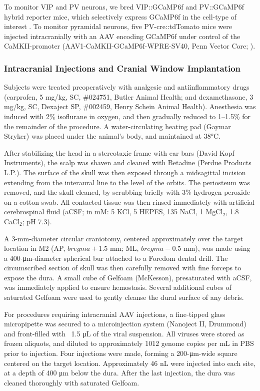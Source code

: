 {To monitor VIP and PV neurons, we bred VIP::GCaMP6f and PV::GCaMP6f hybrid reporter mice, which selectively express GCaMP6f in the cell-type of interest \citep{daigle18,devries20}. 
To monitor pyramidal neurons, five PV-cre::tdTomato mice were injected intracranially with an AAV encoding GCaMP6f under control of the CaMKII-promoter (AAV1-CaMKII-GCaMP6f-WPRE-SV40, Penn Vector Core; \cite{kuchibhotla17,ali20}). 

\subsubsection*{Intracranial Injections and Cranial Window Implantation}
Subjects were treated preoperatively with analgesic and antiinflammatory drugs (carprofen, 5 mg/kg, SC, \#024751, Butler Animal Health; and dexamethasone, 3 mg/kg, SC, Dexaject SP, \#002459, Henry Schein Animal Health). Anesthesia was induced with 2\% isoflurane in oxygen, and then gradually reduced to 1--1.5\% for the remainder of the procedure. A water-circulating heating pad (Gaymar Stryker) was placed under the animal’s body, and maintained at 38\si{\celsius}.

After stabilizing the head in a stereotaxic frame with ear bars (David Kopf Instruments), the scalp was shaven and cleaned with Betadine (Perdue Products L.P.). The surface of the skull was then exposed through a midsagittal incision extending from the interaural line to the level of the orbits. The periosteum was removed, and the skull cleaned, by scrubbing briefly with 3\% hydrogen peroxide on a cotton swab. All contacted tissue was then rinsed immediately with artificial cerebrospinal fluid (aCSF; in mM: 5 KCl, 5 HEPES, 135 NaCl, 1 MgCl$_2$, 1.8 CaCl$_2$; pH 7.3).

A 3-mm-diameter circular craniotomy, centered approximately over the target location in M2 (AP, $bregma + 1.5$ mm; ML, $bregma - 0.5$ mm), was made using a 400-\si{\um}-diameter spherical bur attached to a Foredom dental drill. The circumscribed section of skull was then carefully removed with fine forceps to expose the dura. A small cube of Gelfoam (McKesson), presaturated with aCSF, was immediately applied to ensure hemostasis. Several additional cubes of saturated Gelfoam were used to gently cleanse the dural surface of any debris.

For procedures requiring intracranial AAV injections, a fine-tipped glass micropipette was secured to a microinjection system (Nanoject II, Drummond) and front-filled with ~1.5 \si{\uL} of the viral suspension. All viruses were stored as frozen aliquots, and diluted to approximately 1012 genome copies per mL in PBS prior to injection. Four injections were made, forming a 200-\si{\um}-wide square centered on the target location. Approximately 46 nL were injected into each site, at a depth of 400 \si{\um} below the dura. After the last injection, the dura was cleaned thoroughly with saturated Gelfoam.

}

